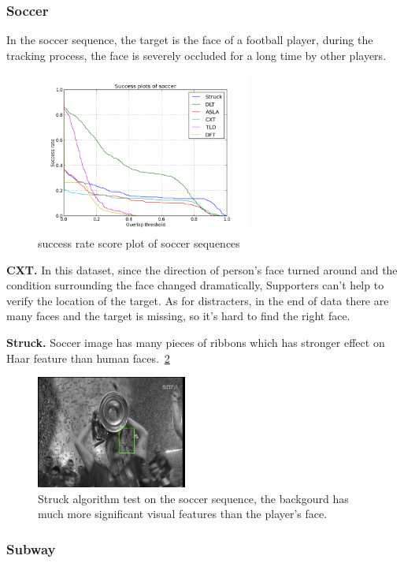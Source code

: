 \documentclass{acm_proc_article-sp}
\begin{document}
\subsubsection{Soccer}

In the soccer sequence, the target is the face of a football player, during the tracking process, the face is severely occluded for a long time by other players.

\begin{figure}[hbt]
	\centering
    \includegraphics[width=200pt]{soccer}
    \caption{success rate score plot of soccer sequences}
    \label{fig:soccer}
\end{figure}

\textbf{CXT.} In this dataset, since the direction of person's face turned around and the condition surrounding the face changed dramatically, Supporters can't help to verify the location of the target. As for distracters, in the end of data there are many faces and the target is missing, so it's hard to find the right face.

\textbf{Struck.}
Soccer image has many pieces of ribbons which has stronger effect on Haar feature than human faces.~\ref{fig:struck_soccer}
\begin{figure}[hbt]
    \centering
    \includegraphics[width=140pt]{struck_soccer}
    \caption{Struck algorithm test on the soccer sequence, the backgourd has much more significant visual features than the player's face.}
    \label{fig:struck_soccer}
\end{figure}

\subsubsection{Subway}
\end{document}
